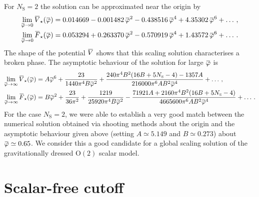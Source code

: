 \documentclass[11pt]{book} %
\newcommand{\overbar}[1]{\mkern 1.5mu\overline{\mkern-1.5mu#1\mkern-1.5mu}\mkern 1.5mu}
\newcommand\NS{ N_{\scriptscriptstyle{\mathrm{S}}} }
\newcommand{\bV}{\overbar V}
\newcommand{\bF}{\overbar F}
\newcommand{\bVstar}{\bV_\star}
\newcommand{\bFstar}{\bF_\star}
\newcommand{\bp}{\overbar \varphi}
\numberwithin{equation}{chapter}
\begin{document}

\noindent For $\NS=2$ the solution can be approximated near the origin by
\begin{align}
  \lim_{\bp \rightarrow 0} \bVstar(\bp) &= 0.014669 - 0.001482 \, \bp ^2 - 0.438516 \, \bp ^4 + 4.35302 \, \bp ^6 + \dots \,, \\
  \lim_{\bp \rightarrow 0} \bFstar(\bp) &= 0.053294 + 0.263370 \, \bp ^2 - 0.570919 \, \bp ^4 + 1.43572 \, \bp ^6 + \dots \,.
\end{align}
The shape of the potential $\bV$ shows that this scaling solution characterises a broken phase.
The asymptotic behaviour of the solution for large $\bp$ is
\begin{align}
  \lim_{\bp \rightarrow \infty} \bVstar(\bp) &= A \bp ^6 + \frac{23}{1440 \pi ^4 B \bp ^2}
                     + \frac{240 \pi ^4 B^2 (16 B+5 \NS-4)-1357 A}{216000 \pi ^6 A B^2 \bp ^4} + \dots \,, \\
  \lim_{\bp \rightarrow \infty} \bFstar(\bp) &= B \bp ^2 + \frac{23}{36 \pi ^2}+\frac{1219}{25920 \pi ^4 B \bp ^2}
                     - \frac{71921 A+2160 \pi ^4 B^2 (16 B+5 \NS-4)}{4665600 \pi ^6 A B^2 \bp ^4} + \dots \,.
\end{align}
For the case $\NS=2$, we were able to establish a very good match between the numerical solution
obtained via shooting methods about the origin and the asymptotic behaviour given above
(setting $A\simeq 5.149$ and $B\simeq 0.273$) about $\bp\simeq0.65$.
We consider this a good candidate for a global scaling solution of the gravitationally
dressed ${\mathrm O(2)}$ scalar model.


\section{Scalar-free cutoff}
\end{document}
